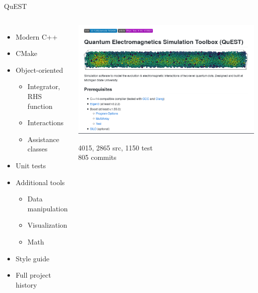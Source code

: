 \documentclass[aspectratio=169, usenames, dvipsnames]{beamer}
\begin{document}
\begin{frame}{QuEST}
  \begin{columns}
      \begin{itemize}
        \item[] Modern C++
        \item[] CMake
        \item[] Object-oriented
          \begin{itemize}
            \item Integrator, RHS function
            \item Interactions
            \item Assistance classes
          \end{itemize}
        \item[] Unit tests
        \item[] Additional tools
          \begin{itemize}
            \item Data manipulation
            \item Visualization
            \item Math
          \end{itemize}
        \item[] Style guide
        \item[] Full project history
      \end{itemize}

      \begin{center}
        \vspace{-0.5cm}
        \href{https://www.github.com/cglosser/quest}{
          \includegraphics[width=\textwidth]{figures/github_cropped.png}
        }

        {\footnotesize \SI{4015}{\sloc}, 2865 src, 1150 test \\ 805 commits }
      \end{center}
  \end{columns}
\end{frame}
\end{document}
